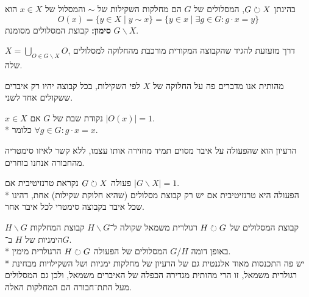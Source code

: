 \begin{definition}[מסלולים]
	בהינתן $G \circlearrowright X$, המסלולים של $G$ הם מחלקות השקילות של $\sim$ והמסלול של $x \in X$ הוא
	\[
		O(x) = \{ y \in X \mid y \sim x\} = \{ y \in x \mid \exists g \in G : g \cdot x = y \}
	\]
	\textbf{סימון:} קבוצת המסלולים מסומנת $G \backslash X$.
\end{definition}
\begin{conclusion}
	$X = \bigcup_{O \in G\backslash X} O$, דרך מזעזעת להגיד שהקבוצה המקורית מורכבת מהחלוקה למסלולים שלה.
\end{conclusion}
מהותית אנו מדברים פה על החלוקה של $X$ לפי השקילות, בכל קבוצה יהיו רק איברים ששקולים אחד לשני.
\begin{definition}
	$x \in X$ נקודת שבת של $G$ אם $|O(x)| = 1$.\\*
	כלומר $\forall g \in G : g \cdot x = x$.
\end{definition}
הרעיון הוא שהפעולה על איבר מסוים תמיד מחזירה אותו עצמו, ללא קשר לאיזו סימטריה מהחבורה אנחנו בוחרים.
\begin{definition}[טרנזיטיבית]
	פעולה $G \circlearrowright X$ נקראת טרנזיטיבית אם $|G \backslash X| = 1$. \\*
	הפעולה היא טרנזיטיבית אם יש רק קבוצת מסלולים (שהיא חלוקת שקילות) אחת, דהינו שכל איבר בקבוצה סימטרי לכל איבר אחר.
\end{definition}
\begin{conclusion}
	$H \backslash G$ קבוצת המסלולים של $H \circlearrowright G$ רגולרית משמאל שקולה ל־$H \backslash G$ קבוצת המחלקות הימניות של $H$ ב־$G$.\\*
	באופן דומה $G / H$ המסלולים של הפעולה $H \circlearrowright G$ הרגולרית מימין. \\*
	יש פה התכנסות מאוד אלגנטית גם של הרעיון של מחלקות ימניות ושל השקילויות מבחינת רגולרית משמאל, זו הרי מהותית מגדירה הכפלה של האיברים משמאל, ולכן גם המסלולים מעל התת־חבורה הם המחלקות האלה.
\end{conclusion}
